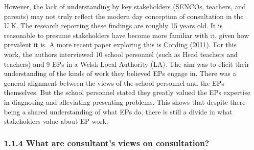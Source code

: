 \documentclass[
]{article}
\begin{document}
However, the lack of understanding by key stakeholders (SENCOs,
teachers, and parents) may not truly reflect the modern day conception
of consultation in the U.K. The research reporting these findings are
roughly 15 years old. It is reasonable to presume stakeholders have
become more familiar with it, given how prevalent it is. A more recent
paper exploring this is
\protect\hyperlink{ref-cordingStudyEducationalPsychologists2011}{Cording}
(\protect\hyperlink{ref-cordingStudyEducationalPsychologists2011}{2011}).
For this work, the authors interviewed 10 school personnel (such as Head
teachers and teachers) and 9 EPs in a Welsh Local Authority (LA). The
aim was to elicit their understanding of the kinds of work they believed
EPs engage in. There was a general alignment between the views of the
school personnel and the EPs themselves. But the school personnel stated
they greatly valued the EPs expertise in diagnosing and alleviating
presenting problems. This shows that despite there being a shared
understanding of what EPs do, there is still a divide in what
stakeholders value about EP work.

\hypertarget{what-are-consultants-views-on-consultation}{%
\subsubsection{1.1.4 What are consultant's views on
consultation?}\label{what-are-consultants-views-on-consultation}}
\end{document}
